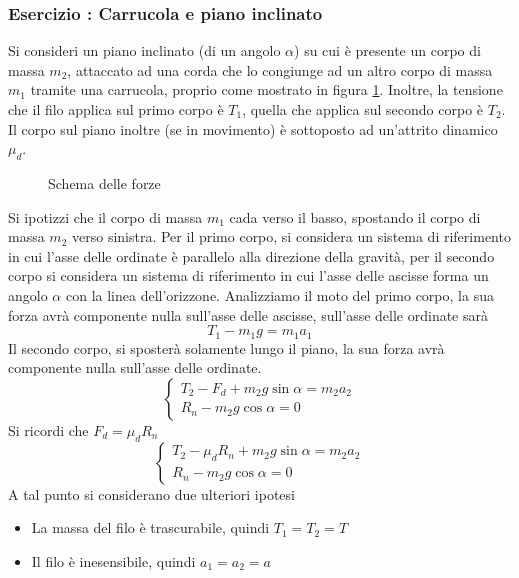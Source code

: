 \documentclass[10pt, letterpaper]{report}
\begin{document}
\subsubsection{Esercizio : Carrucola e piano inclinato}
Si consideri un piano inclinato (di un angolo $\alpha$) su cui è presente un corpo di massa 
$m_2$, attaccato ad una corda che lo congiunge ad un altro corpo di massa $m_1$ tramite una 
carrucola, proprio come mostrato in figura \ref{fig:carrucola}. Inoltre, la tensione che il filo applica 
sul primo corpo è $T_1$, quella che applica sul secondo corpo è $T_2$. Il corpo sul piano inoltre (se in movimento) 
è sottoposto ad un'attrito dinamico $\mu_d$.\acc 
\begin{figure}[h]
    \caption{Schema delle forze}
    \label{fig:carrucola}
\end{figure}
Si ipotizzi che il corpo di massa $m_1$ cada verso il basso, spostando il corpo di massa $m_2$ verso sinistra.
Per il primo corpo, si considera un sistema di riferimento in cui l'asse delle ordinate è parallelo alla 
direzione della gravità, per il secondo corpo si considera un sistema di riferimento in cui 
l'asse delle ascisse forma un angolo $\alpha$ con la linea dell'orizzone. \acc 
Analizziamo il moto del primo corpo, la sua forza avrà componente nulla sull'asse 
delle ascisse, sull'asse delle ordinate sarà 
$$ T_1-m_1g=m_1a_1$$
Il secondo corpo, si sposterà solamente lungo il piano, la sua forza avrà componente nulla sull'asse 
delle ordinate. 
$$\begin{cases}
    T_2-F_d+m_2g\sin\alpha=m_2a_2 \\ 
    R_n-m_2g\cos\alpha = 0
\end{cases}$$
Si ricordi che $F_d=\mu_dR_n$
$$\begin{cases}
    T_2-\mu_dR_n+m_2g\sin\alpha=m_2a_2 \\ 
    R_n-m_2g\cos\alpha = 0
\end{cases}$$
A tal punto si considerano due ulteriori ipotesi\begin{itemize}
    \item La massa del filo è trascurabile, quindi $T_1=T_2=T$ 
    \item Il filo è inesensibile, quindi $a_1=a_2=a$
\end{itemize}
\end{document}
